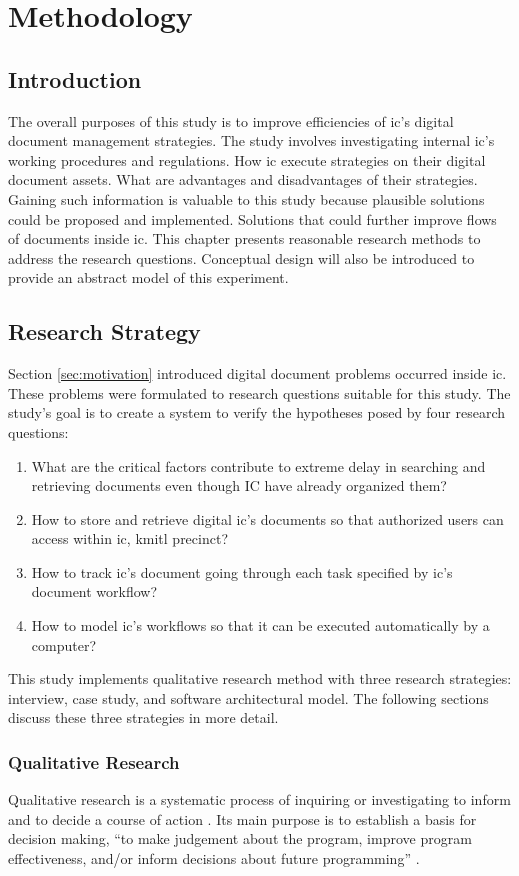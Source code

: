 \chapter{Methodology}
\section{Introduction}
The overall purposes of this study is to improve efficiencies of \gls{ic}'s digital document management strategies. 
The study involves investigating internal \gls{ic}'s working procedures and regulations.
How \gls{ic} execute strategies on their digital document assets.
What are advantages and disadvantages of their strategies.
Gaining such information is valuable to this study because plausible solutions could be proposed and implemented. 
Solutions that could further improve flows of documents inside \gls{ic}.
This chapter presents reasonable research methods to address the research questions.
Conceptual design will also be introduced to provide an abstract model of this experiment.

\section{Research Strategy}
Section \ref{sec:motivation} introduced digital document problems occurred inside \gls{ic}.
These problems were formulated to research questions suitable for this study.
The study's goal is to create a system to verify the hypotheses posed by four research questions:
\begin{enumerate}
	\item What are the critical factors contribute to extreme delay in searching and retrieving documents even though IC have already organized them?
	\item How to store and retrieve digital \gls{ic}'s documents so that authorized users can access within \gls{ic}, \gls{kmitl} precinct?
	\item How to track \gls{ic}'s document going through each task specified by \gls{ic}'s document workflow?
	\item How to model \gls{ic}'s workflows so that it can be executed automatically by a computer?
\end{enumerate}
This study implements qualitative research method with three research strategies: interview, case study, and software architectural model.
The following sections discuss these three strategies in more detail.

\subsection{Qualitative Research}
Qualitative research is a systematic process of inquiring or investigating to inform and to decide a course of action \cite{merriam2015qualitative}.
Its main purpose is to establish a basis for decision making, \enquote{to make judgement about the program, improve program effectiveness, and/or inform decisions about future programming} \cite{patton2005qualitative}.

